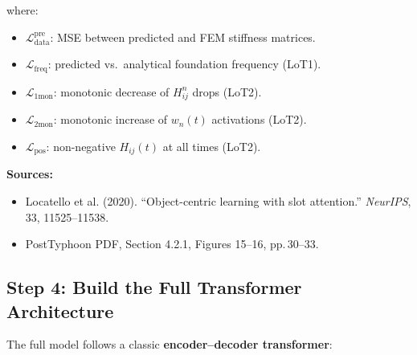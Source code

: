 \documentclass[11pt,a4paper]{article}
\begin{document}
where:
\begin{itemize}[noitemsep]
  \item $\mathcal{L}_{\text{data}}^{\text{pre}}$: MSE between predicted and FEM
        stiffness matrices.
  \item $\mathcal{L}_{\text{freq}}$: predicted vs.\ analytical foundation frequency
        (LoT1).
  \item $\mathcal{L}_{\text{1mon}}$: monotonic decrease of $H^n_{ij}$ drops (LoT2).
  \item $\mathcal{L}_{\text{2mon}}$: monotonic increase of $w_n(t)$ activations (LoT2).
  \item $\mathcal{L}_{\text{pos}}$: non-negative $H_{ij}(t)$ at all times (LoT2).
\end{itemize}

\textbf{Sources:}
\begin{itemize}[noitemsep]
  \item Locatello et al. (2020). ``Object-centric learning with slot attention.''
        \textit{NeurIPS}, 33, 11525--11538.
  \item PostTyphoon PDF, Section 4.2.1, Figures 15--16, pp.\,30--33.
\end{itemize}

\subsection{Step 4: Build the Full Transformer Architecture}

The full model follows a classic \textbf{encoder--decoder transformer}:
\end{document}
